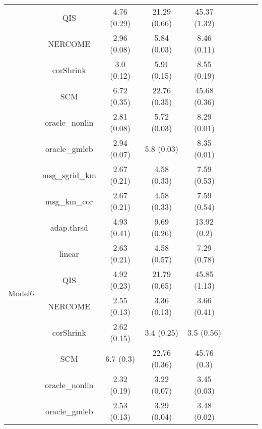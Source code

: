 \documentclass[useAMS,referee,usenatbib]{biom}
\begin{document}
\begin{table}[H]
{\begin{tabular}{ccccccccc}
 & QIS            & 4.76 (0.29) & 21.29 (0.66) & 45.37 (1.32) \\
 & NERCOME        & 2.96 (0.08) & 5.84 (0.03)  & 8.46 (0.11)  \\
 & corShrink      & 3.0 (0.12)  & 5.91 (0.15)  & 8.55 (0.19)  \\
 & SCM            & 6.72 (0.35) & 22.76 (0.35) & 45.68 (0.36) \\
 & oracle\_nonlin & 2.81 (0.08) & 5.72 (0.03)  & 8.29 (0.01)  \\
 & oracle\_gmleb  & 2.94 (0.07) & 5.8 (0.03)   & 8.35 (0.01) \\  \midrule
\multirow{10}{*}{Model6}  
 & msg\_sgrid\_km & 2.67 (0.21) & 4.58 (0.33)  & 7.59 (0.53)  \\
 & msg\_km\_cor   & 2.67 (0.21) & 4.58 (0.33)  & 7.59 (0.54)  \\
 & adap.thrsd     & 4.93 (0.41) & 9.69 (0.26)  & 13.92 (0.2)  \\
 & linear         & 2.63 (0.21) & 4.58 (0.57)  & 7.29 (0.78)  \\
 & QIS            & 4.92 (0.23) & 21.79 (0.65) & 45.85 (1.13) \\
 & NERCOME        & 2.55 (0.13) & 3.36 (0.13)  & 3.66 (0.41)  \\
 & corShrink      & 2.62 (0.15) & 3.4 (0.25)   & 3.5 (0.56)   \\
 & SCM            & 6.7 (0.3)   & 22.76 (0.36) & 45.76 (0.3)  \\
 & oracle\_nonlin & 2.32 (0.19) & 3.22 (0.07)  & 3.45 (0.03)  \\
 & oracle\_gmleb  & 2.53 (0.13) & 3.29 (0.04)  & 3.48 (0.02) \\ \bottomrule
\end{tabular}%
}
\end{table}
\end{document}
